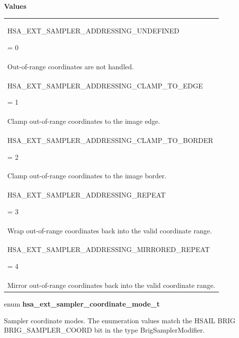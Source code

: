 \documentclass[final]{book}
\newcommand{\reftyp}[1]{#1}
\newcommand{\refenu}[1]{\reftyp{#1}}
\begin{document}
\noindent\textbf{Values}\\[-5mm]
\begin{longtable}{@{\hspace{2em}}p{\linewidth-2em}}
\hspace{-2em}\hypertarget{group__images_1gga60a9fcdc1a1f338bd7e54445359fdf0fa71da8d9ecab1818ef69ec7aa88730885}{\refenu{HSA_EXT_SAMPLER_ADDRESSING_UNDEFINED}} = 0\\Out-of-range coordinates are not handled.\\[2mm]
\hspace{-2em}\hypertarget{group__images_1gga60a9fcdc1a1f338bd7e54445359fdf0faafa8c11b4dddb86df2c109ffb6345dfb}{\refenu{HSA_EXT_SAMPLER_ADDRESSING_CLAMP_TO_EDGE}} = 1\\Clamp out-of-range coordinates to the image edge.\\[2mm]
\hspace{-2em}\hypertarget{group__images_1gga60a9fcdc1a1f338bd7e54445359fdf0fad500561ebe9ee4a25b009b22350d9fa5}{\refenu{HSA_EXT_SAMPLER_ADDRESSING_CLAMP_TO_BORDER}} = 2\\Clamp out-of-range coordinates to the image border.\\[2mm]
\hspace{-2em}\hypertarget{group__images_1gga60a9fcdc1a1f338bd7e54445359fdf0fa7273d0bc1975172ea511bbd5b78bd151}{\refenu{HSA_EXT_SAMPLER_ADDRESSING_REPEAT}} = 3\\Wrap out-of-range coordinates back into the valid coordinate range.\\[2mm]
\hspace{-2em}\hypertarget{group__images_1gga60a9fcdc1a1f338bd7e54445359fdf0fa1c33e3d12293bfd69364ea8498451b5b}{\refenu{HSA_EXT_SAMPLER_ADDRESSING_MIRRORED_REPEAT}} = 4\\Mirror out-of-range coordinates back into the valid coordinate range.
\end{longtable}

\noindent\begin{tcolorbox}[breakable,nobeforeafter,arc=0mm,colframe=white,colback=lightgray,left=0mm]
enum \hypertarget{group__images_1gad7644f3eccb4f8ce5693313b88440d87}{\textbf{hsa_ext_sampler_coordinate_mode_t}}
\end{tcolorbox}
Sampler coordinate modes. The enumeration values match the HSAIL BRIG BRIG_SAMPLER_COORD bit in the type BrigSamplerModifier.
\end{document}
